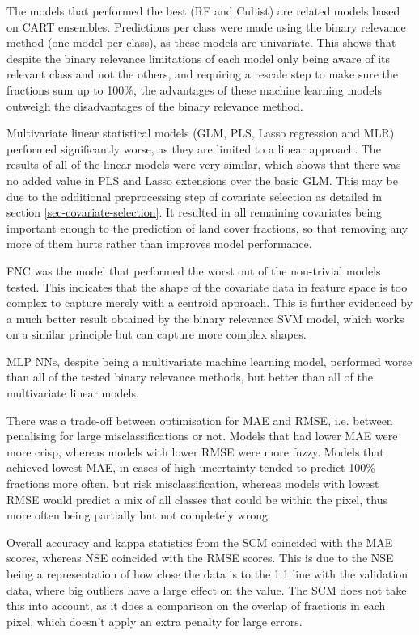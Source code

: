 \documentclass[a4paper,10pt]{article}
\begin{document}
The models that performed the best (\gls{RF} and Cubist) are related models based on \gls{CART} ensembles.
Predictions per class were made using the binary relevance method (one model per class), as these models are univariate.
This shows that despite the binary relevance limitations of each model only being aware of its relevant class and not the others, and requiring a rescale step to make sure the fractions sum up to 100\%, the advantages of these machine learning models outweigh the disadvantages of the binary relevance method.

Multivariate linear statistical models (\gls{GLM}, \gls{PLS}, Lasso regression and \gls{MLR}) performed significantly worse, as they are limited to a linear approach.
The results of all of the linear models were very similar, which shows that there was no added value in \gls{PLS} and Lasso extensions over the basic \gls{GLM}.
This may be due to the additional preprocessing step of covariate selection as detailed in section \ref{sec-covariate-selection}.
It resulted in all remaining covariates being important enough to the prediction of land cover fractions, so that removing any more of them hurts rather than improves model performance.

\Gls{FNC} was the model that performed the worst out of the non-trivial models tested.
This indicates that the shape of the covariate data in feature space is too complex to capture merely with a centroid approach.
This is further evidenced by a much better result obtained by the binary relevance \gls{SVM} model, which works on a similar principle but can capture more complex shapes.

\Gls{MLP} \glspl{NN}, despite being a multivariate machine learning model, performed worse than all of the tested binary relevance methods, but better than all of the multivariate linear models.

There was a trade-off between optimisation for \gls{MAE} and \gls{RMSE}, i.e. between penalising for large misclassifications or not.
Models that had lower \gls{MAE} were more crisp, whereas models with lower \gls{RMSE} were more fuzzy.
Models that achieved lowest \gls{MAE}, in cases of high uncertainty tended to predict 100\% fractions more often, but risk misclassification, whereas models with lowest \gls{RMSE} would predict a mix of all classes that could be within the pixel, thus more often being partially but not completely wrong.

Overall accuracy and kappa statistics from the \gls{SCM} coincided with the \gls{MAE} scores, whereas \gls{NSE} coincided with the \gls{RMSE} scores.
This is due to the \gls{NSE} being a representation of how close the data is to the 1:1 line with the validation data, where big outliers have a large effect on the value.
The \gls{SCM} does not take this into account, as it does a comparison on the overlap of fractions in each pixel, which doesn't apply an extra penalty for large errors.
\end{document}
